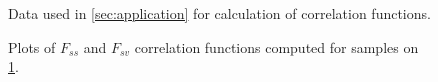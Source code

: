 \documentclass[reprint,amsmath,amssymb,aps,pre,showkeys,showpacs]{revtex4-1}
\begin{document}
\begin{figure}[t]
{    \label{fig:carbonate2}}
  \hfill
  \caption[]{Data used in \cref{sec:application} for calculation of correlation
    functions.}
  \label{fig:real-data}
\end{figure}

\begin{figure}[t]
  \centering
  \hfill
  \caption[]{Plots of $F_{ss}$ and $F_{sv}$ correlation functions computed for
    samples on \cref{fig:real-data}.}
  \label{fig:real-data-plots}
\end{figure}
\end{document}
